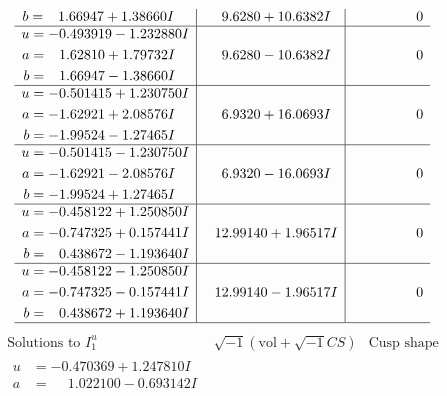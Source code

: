 \documentclass[1p]{elsarticle_modified}
\theoremstyle{definition}
\newcommand{\I}{\sqrt{-1}}
\begin{document}
$$\begin{array}{c|c|c}
\begin{aligned}
b &= \phantom{-}1.66947 + 1.38660 I\end{aligned}
 & \phantom{-}9.6280 + 10.6382 I & \phantom{-0.000000 } 0 \\ \hline\begin{aligned}
u &= -0.493919 - 1.232880 I \\
a &= \phantom{-}1.62810 + 1.79732 I \\
b &= \phantom{-}1.66947 - 1.38660 I\end{aligned}
 & \phantom{-}9.6280 - 10.6382 I & \phantom{-0.000000 } 0 \\ \hline\begin{aligned}
u &= -0.501415 + 1.230750 I \\
a &= -1.62921 + 2.08576 I \\
b &= -1.99524 - 1.27465 I\end{aligned}
 & \phantom{-}6.9320 + 16.0693 I & \phantom{-0.000000 } 0 \\ \hline\begin{aligned}
u &= -0.501415 - 1.230750 I \\
a &= -1.62921 - 2.08576 I \\
b &= -1.99524 + 1.27465 I\end{aligned}
 & \phantom{-}6.9320 - 16.0693 I & \phantom{-0.000000 } 0 \\ \hline\begin{aligned}
u &= -0.458122 + 1.250850 I \\
a &= -0.747325 + 0.157441 I \\
b &= \phantom{-}0.438672 - 1.193640 I\end{aligned}
 & \phantom{-}12.99140 + 1.96517 I & \phantom{-0.000000 } 0 \\ \hline\begin{aligned}
u &= -0.458122 - 1.250850 I \\
a &= -0.747325 - 0.157441 I \\
b &= \phantom{-}0.438672 + 1.193640 I\end{aligned}
 & \phantom{-}12.99140 - 1.96517 I & \phantom{-0.000000 } 0\\
 \hline 
 \end{array}$$\newpage$$\begin{array}{c|c|c}  
\text{Solutions to }I^u_{1}& \I (\text{vol} + \sqrt{-1}CS) & \text{Cusp shape}\\
 \hline 
\begin{aligned}
u &= -0.470369 + 1.247810 I \\
a &= \phantom{-}1.022100 - 0.693142 I \\

\end{aligned}
\end{array}$$
\end{document}
